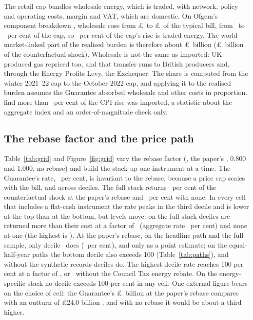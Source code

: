 The retail cap bundles wholesale energy, which is traded, with
network, policy and operating costs, margin and VAT, which are
domestic. On Ofgem's component breakdown \citep{ofgem2021, ofgem2022}, wholesale
rose from \pounds\MsEnergyWholesaleBase\ to
\pounds\MsEnergyWholesalePeak\ of the typical bill, from
\MsEnergyWholesaleShareCapBasePct\ to
\MsEnergyWholesaleShareCapPeakPct\ per cent of the cap, so
\MsEnergyWholesaleShareOfRisePct\ per cent of the cap's rise is traded
energy. The world-market-linked part of the realised burden is
therefore about \pounds\MsEnergyRealisedTradeTransmittedAggBn\ billion
(\pounds\MsEnergyTradeTransmittedAggBn\ billion of the counterfactual
shock). Wholesale is not the same as imported: UK-produced gas
repriced too, and that transfer runs to British producers and, through
the Energy Profits Levy, the Exchequer. The share is computed from
the winter 2021--22 cap to the October 2022 cap, and applying it to
the realised burden assumes the Guarantee absorbed wholesale and other
costs in proportion. \citet{dhingrapage2023} find more than
\MsEnergyImportedShareLowerBound\ per cent of the CPI rise was
imported, a statistic about the aggregate index and an
order-of-magnitude check only.

\subsection{The rebase factor and the price path}\label{sec:results-grid}

Table~\ref{tab:grid} and Figure~\ref{fig:grid} vary the rebase factor
(\SsGridLowRebase, the paper's \SsRebaseFactor, 0.800 and 1.000, no
rebase) and build the stack up one instrument at a time. The
Guarantee's rate, \SsGridPaperEpgRatePct\ per cent, is invariant to
the rebase, because a price cap scales with the bill, and across
deciles. The full stack returns \SsGridPaperFullRatePct\ per cent of
the counterfactual shock at the paper's rebase and
\SsGridUnityFullRatePct\ per cent with none. In every cell that
includes a flat-cash instrument the rate peaks in the third decile and
is lower at the top than at the bottom, but levels move: on
the full stack \numword{\SsGridLowDecilesAboveHundred} deciles are returned
more than their cost at a factor of \SsGridLowRebase\ (aggregate rate
\SsGridLowFullRatePct\ per cent) and none at one (the highest is
\SsGridUnityFullMaxDecilePct). At the paper's rebase, on the headline
path and the full sample, only decile \SsDecilesAboveHundredList\
does (\SsGridPaperFullMaxDecilePct\ per cent), and only as a point
estimate; on the equal-half-year paths the bottom decile also exceeds
100 (Table~\ref{tab:paths}), and without the synthetic records
\numword{\SsNoSynDecilesAboveHundred} deciles do. The
highest decile rate reaches 100 per cent at a factor of
\SsGridMaxDecileRebaseAtHundred, or
\SsGridNoCtrMaxDecileRebaseAtHundred\ without the Council Tax energy
rebate. On the energy-specific stack no decile exceeds 100 per cent in
any cell. One external figure bears on the choice of cell: the
Guarantee's \pounds\SsEpgBn\ billion at the paper's rebase compares
with an outturn of \pounds 24.0 billion \citep{nao2024}, and with no
rebase it would be about a third higher.

